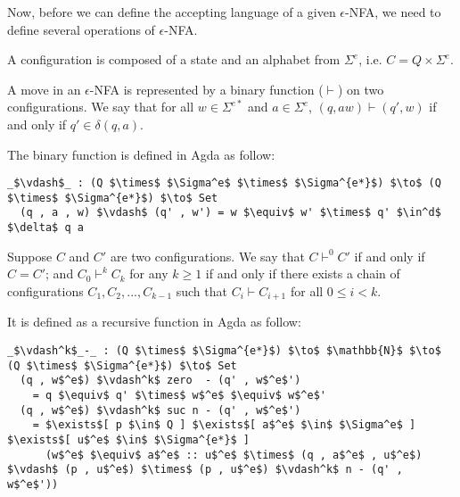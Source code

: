 \par Now, before we can define the accepting language of a given
\(\epsilon\)-NFA, we need to define several operations of
\(\epsilon\)-NFA. 

\begin{defn}
\noindent A configuration is composed of a state and an alphabet from
\(\Sigma^e\), i.e. \(C = Q \times \Sigma^e\). 
\end{defn}

\begin{defn}
\noindent A move in an \(\epsilon\)-NFA is
represented by a binary function (\(\vdash\)) on two configurations. We say
that for all \(w \in \Sigma^{e*}\) and \(a \in \Sigma^e\), \((q, aw)
\vdash (q' , w)\) if and only if \(q' \in \delta (q , a)\). 
\end{defn}

\par The binary function is defined in Agda as follow: 
\begin{lstlisting}[mathescape=true,xleftmargin=.3\textwidth]
  _$\vdash$_ : (Q $\times$ $\Sigma^e$ $\times$ $\Sigma^{e*}$) $\to$ (Q $\times$ $\Sigma^{e*}$) $\to$ Set
  (q , a , w) $\vdash$ (q' , w') = w $\equiv$ w' $\times$ q' $\in^d$ $\delta$ q a
\end{lstlisting}

\begin{defn}
\noindent Suppose \(C\) and \(C'\) are two configurations. We say that \(C \vdash^0 C'\) if and only
if \(C = C'\); and \(C_0 \vdash^k C_k\) for any \(k \geq 1\) if and only if there exists a chain of
configurations \(C_1, C_2, ..., C_{k-1}\) such that \(C_i \vdash C_{i+1}\) for all \(0 \leq i < k\). 
\end{defn}

\par It is defined as a recursive function in Agda as follow: 
\begin{lstlisting}[mathescape=true,xleftmargin=.3\textwidth]
  _$\vdash^k$_-_ : (Q $\times$ $\Sigma^{e*}$) $\to$ $\mathbb{N}$ $\to$ (Q $\times$ $\Sigma^{e*}$) $\to$ Set
  (q , w$^e$) $\vdash^k$ zero  - (q' , w$^e$')
    = q $\equiv$ q' $\times$ w$^e$ $\equiv$ w$^e$'
  (q , w$^e$) $\vdash^k$ suc n - (q' , w$^e$') 
    = $\exists$[ p $\in$ Q ] $\exists$[ a$^e$ $\in$ $\Sigma^e$ ] $\exists$[ u$^e$ $\in$ $\Sigma^{e*}$ ]
      (w$^e$ $\equiv$ a$^e$ :: u$^e$ $\times$ (q , a$^e$ , u$^e$) $\vdash$ (p , u$^e$) $\times$ (p , u$^e$) $\vdash^k$ n - (q' , w$^e$'))
\end{lstlisting}

